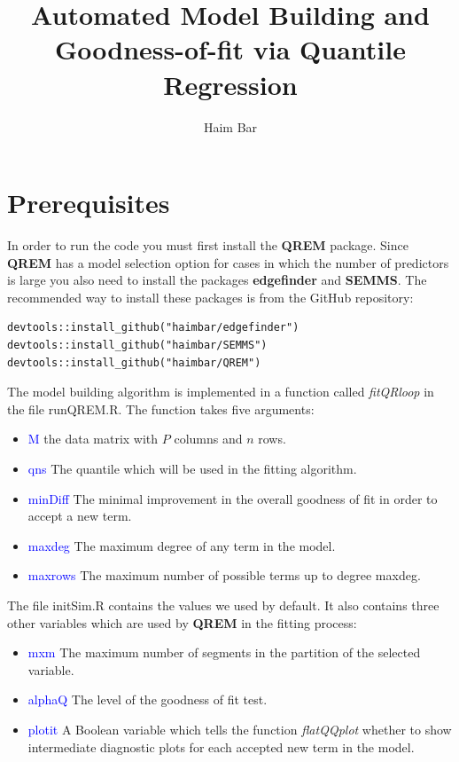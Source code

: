 \documentclass[a4paper,12pt]{article}
\title{Automated Model Building and Goodness-of-fit via Quantile Regression}
\author{Haim Bar}
\newcommand{\func}[1]{\textit{#1}}
\newcommand{\pkg}[1]{\textbf{#1}}
\begin{document}
\maketitle
{}

\section{Prerequisites}
In order to run the code you must first install the \pkg{QREM} package. Since \pkg{QREM} has a model selection option for cases in which the number of predictors is large you also need to install the packages \pkg{edgefinder} and \pkg{SEMMS}. The recommended way to install these packages is from the GitHub repository:

\begin{Verbatim}
devtools::install_github("haimbar/edgefinder")
devtools::install_github("haimbar/SEMMS")
devtools::install_github("haimbar/QREM")
\end{Verbatim}

The model building algorithm is implemented in a function called \func{fitQRloop} in the file runQREM.R. The function takes five arguments:
\begin{itemize}
 \item \textcolor{blue}{M} the data matrix with $P$ columns and $n$ rows.
 \item \textcolor{blue}{qns} The quantile which will be used in the fitting algorithm.
 \item \textcolor{blue}{minDiff} The minimal improvement in the overall goodness of fit in order to accept a new term.
 \item \textcolor{blue}{maxdeg} The maximum degree of any term in the model.
 \item \textcolor{blue}{maxrows} The maximum number of possible terms up to degree maxdeg.
\end{itemize}
The file initSim.R contains the values we used by default. It also contains three other variables which are used by \pkg{QREM} in the fitting process:
\begin{itemize}
 \item \textcolor{blue}{mxm} The maximum number of segments in the partition of the selected variable.
 \item \textcolor{blue}{alphaQ} The level of the goodness of fit test.
 \item \textcolor{blue}{plotit} A Boolean variable which tells the function \func{flatQQplot} whether to show intermediate diagnostic plots for each accepted new term in the model.
\end{itemize}
\end{document}
